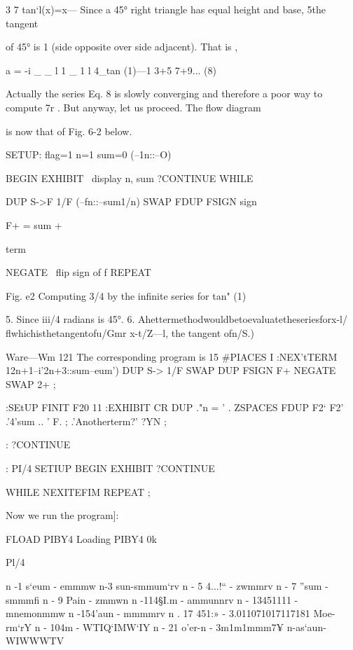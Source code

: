 3 7
tan‘l(x)=x—%
Since a 45° right triangle has equal height and base, 5the tangent

of 45° is 1 (side opposite over side adjacent). That is ,

a = -i _ _ l 1 _ 1 l
4_tan (1)—1 3+5 7+9... (8)

Actually the series Eq. 8 is slowly converging and therefore a poor
way to compute 7r . But anyway, let us proceed. The ﬂow diagram

is now that of Fig. 6-2 below.

 

SETUP: ﬂag=1 n=1 sum=0 (--1n::--O)

BEGIN
EXHIBIT \ display n, sum
?CONTINUE WHILE

DUP S->F 1/F (--fn::--sum1/n)
SWAP FDUP FSIGN \transfer sign

 

 

F+ \sum = sum +

term

NEGATE \ ﬂip sign of f
REPEAT

 

 

 

Fig. e2 Computing 3/4 by the inﬁnite series for tan" (1)

 

5. Since iii/4 radians is 45°.
6. Ahettermethodwouldbetoevaluatetheseriesforx-l/ﬂwhichisthetangentofu/Gmr
x-t/Z—l, the tangent ofn/S.)

Ware—Wm 121
The corresponding program is
15 #PIACES I \eetEtoiSdigits
:NEX'tTERM 12n+1--i'2n+3::sum--eum')
DUP S-> 1/F SWAP DUP FSIGN F+
NEGATE SWAP 2+ ;

:SEtUP FINIT F20 11
:EXHIBIT CR DUP
."n = ' . ZSPACES
FDUP F2‘ F2' .'4'sum .. ' F. ;
.'Anotherterm?' ?YN ;

: ?CONTINUE

: PI/4 SETIUP
BEGIN EXHIBIT
?CONTINUE

WHILE NEXITEFIM REPEAT ;

Now we run the program]:

FLOAD PIBY4 Loading PIBY4 0k

Pl/4

n -1 s‘eum - emmmw
n-3 sun-smmum‘rv
n - 5 4...!“ - zwmmrv
n - 7 ”sum - smmmﬁ
n - 9 Pain - zmmwn
n -114§I.m - ammunnrv
n - 13451111 - mnemonmmw
n -154'aun - mmmmrv
n . 17 451:» - 3.011071017117181 Moe-rm‘rY
n - 104m - WTIQ‘IMW‘IY
n - 21 o'er-n - 3m1m1mmm7¥
n-as‘aun-WIWWWTV

